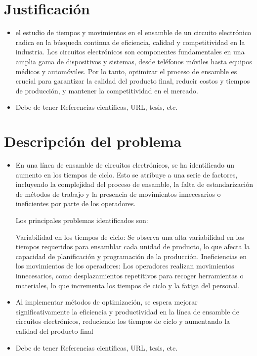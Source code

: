     \section{Justificación}
    
    \begin{itemize}
        \item el estudio de tiempos y movimientos en el ensamble de un circuito electrónico radica en la búsqueda continua de eficiencia, calidad y competitividad en la industria. Los circuitos electrónicos son componentes fundamentales en una amplia gama de dispositivos y sistemas, desde teléfonos móviles hasta equipos médicos y automóviles. Por lo tanto, optimizar el proceso de ensamble es crucial para garantizar la calidad del producto final, reducir costos y tiempos de producción, y mantener la competitividad en el mercado.
        \item Debe de tener Referencias científicas, URL, tesis, etc.
    \end{itemize}
    \section{Descripción del problema}
    \begin{itemize}
        \item En una línea de ensamble de circuitos electrónicos, se ha identificado un aumento en los tiempos de ciclo. Esto se atribuye a una serie de factores, incluyendo la complejidad del proceso de ensamble, la falta de estandarización de métodos de trabajo y la presencia de movimientos innecesarios o ineficientes por parte de los operadores.
    
    Los principales problemas identificados son:
    
    Variabilidad en los tiempos de ciclo: Se observa una alta variabilidad en los tiempos requeridos para ensamblar cada unidad de producto, lo que afecta la capacidad de planificación y programación de la producción.
    Ineficiencias en los movimientos de los operadores: Los operadores realizan movimientos innecesarios, como desplazamientos repetitivos para recoger herramientas o materiales, lo que incrementa los tiempos de ciclo y la fatiga del personal.
        \item Al implementar métodos de optimización, se espera mejorar significativamente la eficiencia y productividad en la línea de ensamble de circuitos electrónicos, reduciendo los tiempos de ciclo y aumentando la calidad del producto final
        \item Debe de tener Referencias científicas, URL, tesis, etc.
    \end{itemize}
    
